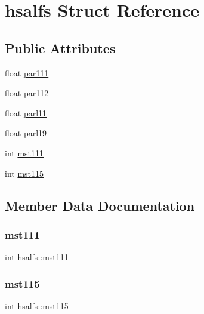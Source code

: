 \hypertarget{structhsalfs}{}\section{hsalfs Struct Reference}
\label{structhsalfs}
\subsection*{Public Attributes}
\begin{DoxyCompactItemize}
\item 
float \hyperlink{structhsalfs_a6e0caeed0136d8d0a1ce8be0fbea64c9}{par111}
\item 
float \hyperlink{structhsalfs_aaa5a9ec0228550ed2b1f4ae093eb1bac}{par112}
\item 
float \hyperlink{structhsalfs_a6bee8c9ef5c16bee30a8e5af4f3afe92}{parl11}
\item 
float \hyperlink{structhsalfs_a0f6dcc0ffa11d6b26b7b756b111fdbfa}{parl19}
\item 
int \hyperlink{structhsalfs_a27eba26edf9600780896865aee441354}{mst111}
\item 
int \hyperlink{structhsalfs_a8ccadcbd7cf17dc34bc3f4145d1766aa}{mst115}
\end{DoxyCompactItemize}


\subsection{Member Data Documentation}
\mbox{\label{structhsalfs_a27eba26edf9600780896865aee441354}} 
\subsubsection{\texorpdfstring{mst111}{mst111}}
{\footnotesize\ttfamily int hsalfs\+::mst111}

\mbox{\label{structhsalfs_a8ccadcbd7cf17dc34bc3f4145d1766aa}} 
\subsubsection{\texorpdfstring{mst115}{mst115}}
{\footnotesize\ttfamily int hsalfs\+::mst115}

\mbox{\label{structhsalfs_a6e0caeed0136d8d0a1ce8be0fbea64c9}} 
